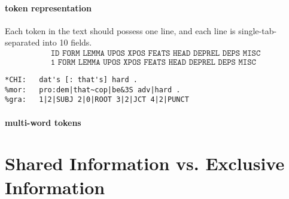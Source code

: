 \paragraph{token representation}
Each token in the text should possess one line, and each line is single-tab-separated into 10 fields.
\begin{align*}
\texttt{ID	FORM	LEMMA	UPOS	XPOS	FEATS	HEAD	DEPREL	DEPS	MISC}\\
\texttt{1	FORM	LEMMA	UPOS	XPOS	FEATS	HEAD	DEPREL	DEPS	MISC}
\end{align*}

\lstset{
numbers=left,
numberstyle=\small,
numbersep=8pt,
frame = single,
language=Pascal,
framexleftmargin=15pt}


\begin{lstlisting}
*CHI:	dat's [: that's] hard .
%mor:	pro:dem|that~cop|be&3S adv|hard .
%gra:	1|2|SUBJ 2|0|ROOT 3|2|JCT 4|2|PUNCT
\end{lstlisting}

\paragraph{multi-word tokens}


\section{Shared Information vs. Exclusive Information}
